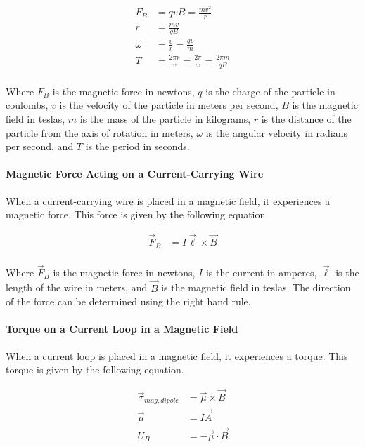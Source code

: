 \begin{align*}
    F_B &= qvB = \frac{mv^2}{r}\\
    r &= \frac{mv}{qB}\\
    \omega &= \frac{v}{r} = \frac{qv}{m}\\
    T &= \frac{2\pi r}{v} = \frac{2\pi}{\omega} = \frac{2\pi m}{qB}\\
\end{align*}

Where $F_B$ is the magnetic force in newtons, $q$ is the charge of the particle in coulombs, $v$ is the velocity of the 
particle in meters per second, $B$ is the magnetic field in teslas, $m$ is the mass of the particle in kilograms, $r$ is 
the distance of the particle from the axis of rotation in meters, $\omega$ is the angular velocity in radians per second, 
and $T$ is the period in seconds.\\

\paragraph*{Magnetic Force Acting on a Current-Carrying Wire}
When a current-carrying wire is placed in a magnetic field, it experiences a magnetic force. This force is given by the
following equation.

\begin{align*}
    \vec{F}_B &= I\vec{\ell} \times \vec{B}\\
\end{align*}

Where $\vec{F}_B$ is the magnetic force in newtons, $I$ is the current in amperes, $\vec{\ell}$ is the length of the wire in meters,
and $\vec{B}$ is the magnetic field in teslas. The direction of the force can be determined using the right hand rule.\\

\paragraph*{Torque on a Current Loop in a Magnetic Field}
When a current loop is placed in a magnetic field, it experiences a torque. This torque is given by the following equation.

\begin{align*}
    \vec{\tau}_{mag,dipole} &= \vec{\mu} \times \vec{B}\\
    \vec{\mu} &= I\vec{A}\\
    U_B &= -\vec{\mu} \cdot \vec{B}\\
\end{align*}

